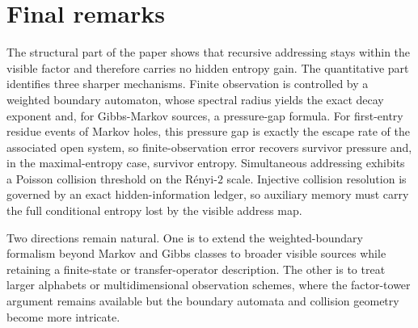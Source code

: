\section{Final remarks}\label{sec:conclusion}

The structural part of the paper shows that recursive addressing stays
within the visible factor and therefore carries no hidden entropy gain.
The quantitative part identifies three sharper mechanisms.  Finite
observation is controlled by a weighted boundary automaton, whose
spectral radius yields the exact decay exponent and, for Gibbs-Markov
sources, a pressure-gap formula.  For first-entry residue events of
Markov holes, this pressure gap is exactly the escape rate of the
associated open system, so finite-observation error recovers survivor
pressure and, in the maximal-entropy case, survivor entropy.  Simultaneous
addressing exhibits a Poisson collision threshold on the R\'enyi-\(2\)
scale.  Injective collision resolution is governed by an exact
hidden-information ledger, so auxiliary memory must carry the full
conditional entropy lost by the visible address map.

Two directions remain natural.  One is to extend the weighted-boundary
formalism beyond Markov and Gibbs classes to broader visible sources
while retaining a finite-state or transfer-operator description.  The
other is to treat larger alphabets or multidimensional observation
schemes, where the factor-tower argument remains available but the
boundary automata and collision geometry become more intricate.
